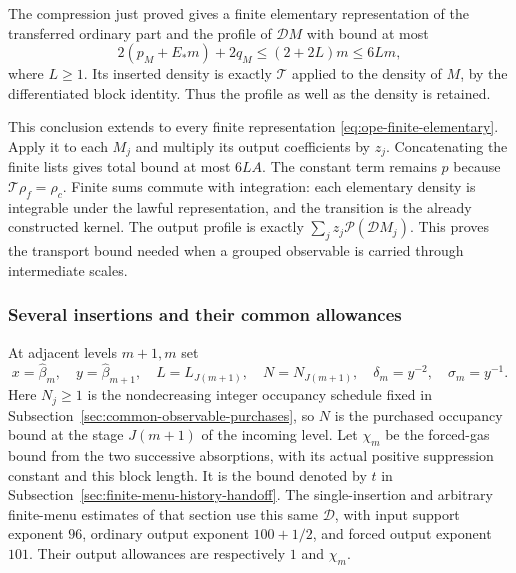 The compression just proved gives a finite elementary representation
of the transferred ordinary part and the profile of $\mathcal D M$
with bound at most
\[
 2(p_M+E_*m)+2q_M\le(2+2L)m\le6Lm,
\]
where $L\ge1$. Its inserted density is exactly $\mathcal T$ applied
to the density of $M$, by the differentiated block identity. Thus the
profile as well as the density is retained.

This conclusion extends to every finite representation
\eqref{eq:ope-finite-elementary}. Apply it to each $M_j$ and multiply
its output coefficients by $z_j$. Concatenating the finite lists
gives total bound at most $6LA$. The constant term remains $p$
because $\mathcal T\rho_f=\rho_c$. Finite sums commute with integration:
each elementary density is integrable under the lawful representation,
and the transition is the already constructed kernel. The output
profile is exactly $\sum_jz_j\mathcal P(\mathcal D M_j)$. This proves
the transport bound needed when a grouped observable is carried
through intermediate scales.

\subsubsection{Several insertions and their common allowances}

At adjacent levels $m+1,m$ set
\[
 x=\widehat\beta_m,\quad y=\widehat\beta_{m+1},\quad
 L=L_{J(m+1)},\quad N=N_{J(m+1)},\quad
 \delta_m=y^{-2},\quad \sigma_m=y^{-1}.
\]
Here $N_j\ge1$ is the nondecreasing integer occupancy schedule fixed in
Subsection~\ref{sec:common-observable-purchases}, so $N$ is the purchased
occupancy bound at the stage $J(m+1)$ of the incoming level.
Let $\chi_m$ be the forced-gas bound from the two successive
absorptions, with its actual positive suppression constant and this
block length. It is the bound denoted by $t$ in
Subsection~\ref{sec:finite-menu-history-handoff}. The single-insertion
and arbitrary finite-menu estimates of that section use this same
$\mathcal D$, with input support exponent $96$, ordinary output
exponent $100+1/2$, and forced output exponent $101$. Their output
allowances are respectively $1$ and $\chi_m$.

